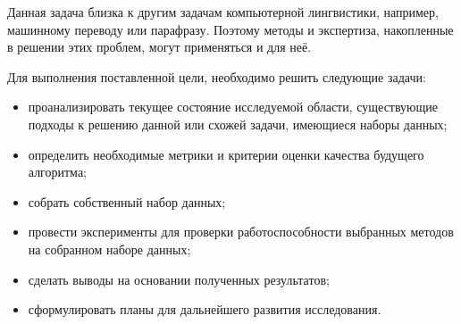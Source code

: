 Данная задача близка к другим задачам компьютерной лингвистики, например, машинному переводу или парафразу.
Поэтому методы и экспертиза, накопленные в решении этих проблем, могут применяться и для неё.

Для выполнения поставленной цели, необходимо решить следующие задачи:
\begin{itemize}
    \item проанализировать текущее состояние исследуемой области, существующие подходы к решению данной или схожей задачи, имеющиеся наборы данных;
    \item определить необходимые метрики и критерии оценки качества будущего алгоритма;
    \item собрать собственный набор данных;
    \item провести эксперименты для проверки работоспособности выбранных методов на собранном наборе данных;
    \item сделать выводы на основании полученных результатов;
    \item сформулировать планы для дальнейшего развития исследования.
\end{itemize}
